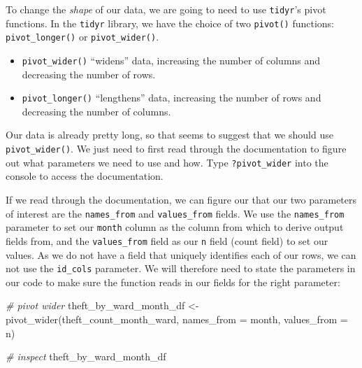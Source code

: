 \documentclass[
]{book}
\newenvironment{Shaded}{\begin{snugshade}}{\end{snugshade}}
\newcommand{\AttributeTok}[1]{\textcolor[rgb]{0.77,0.63,0.00}{#1}}
\newcommand{\CommentTok}[1]{\textcolor[rgb]{0.56,0.35,0.01}{\textit{#1}}}
\newcommand{\FunctionTok}[1]{\textcolor[rgb]{0.00,0.00,0.00}{#1}}
\newcommand{\NormalTok}[1]{#1}
\newcommand{\OtherTok}[1]{\textcolor[rgb]{0.56,0.35,0.01}{#1}}
\providecommand{\tightlist}{%
  \setlength{\itemsep}{0pt}\setlength{\parskip}{0pt}}
\begin{document}
To change the \emph{shape} of our data, we are going to need to use \texttt{tidyr}'s pivot functions. In the \texttt{tidyr} library, we have the choice of two \texttt{pivot()} functions: \texttt{pivot\_longer()} or \texttt{pivot\_wider()}.

\begin{itemize}
\tightlist
\item
  \texttt{pivot\_wider()} ``widens'' data, increasing the number of columns and decreasing the number of rows.
\item
  \texttt{pivot\_longer()} ``lengthens'' data, increasing the number of rows and decreasing the number of columns.
\end{itemize}

Our data is already pretty long, so that seems to suggest that we should use \texttt{pivot\_wider()}. We just need to first read through the documentation to figure out what parameters we need to use and how. Type \texttt{?pivot\_wider} into the console to access the documentation.

If we read through the documentation, we can figure our that our two parameters of interest are the \texttt{names\_from} and \texttt{values\_from} fields. We use the \texttt{names\_from} parameter to set our \texttt{month} column as the column from which to derive output fields from, and the \texttt{values\_from} field as our \texttt{n} field (count field) to set our values. As we do not have a field that uniquely identifies each of our rows, we can not use the \texttt{id\_cols} parameter. We will therefore need to state the parameters in our code to make sure the function reads in our fields for the right parameter:

\begin{Shaded}
\begin{Highlighting}[]
\CommentTok{\# pivot wider}
\NormalTok{theft\_by\_ward\_month\_df }\OtherTok{\textless{}{-}} \FunctionTok{pivot\_wider}\NormalTok{(theft\_count\_month\_ward, }\AttributeTok{names\_from =}\NormalTok{ month,}
    \AttributeTok{values\_from =}\NormalTok{ n)}

\CommentTok{\# inspect}
\NormalTok{theft\_by\_ward\_month\_df}
\end{Highlighting}
\end{Shaded}
\end{document}
